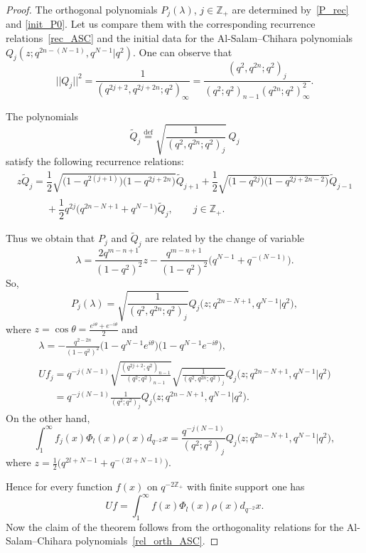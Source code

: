 \begin{proof}
The orthogonal polynomials $P_j(\lambda)$, $j\in\mathbb{Z}_+$ are determined by~\eqref{P_rec} and
\eqref{init_P0}. Let us compare them with the corresponding recurrence relations~\eqref{rec_ASC} and the
initial data for the Al-Salam--Chihara polynomials $Q_j(z;q^{2n-(N-1)},q^{N-1}|q^2)$. One can observe that
\[
||Q_j||^2=\frac{1}{(q^{2j+2},q^{2j+2n};q^2)_\infty}=\frac{(q^2,q^{2n};q^2)_j}{(q^2;q^2)_{n-1}(q^{2n};q^2)^2_\infty}.
\]

The polynomials
\[
\widetilde{Q}_j\overset{\mathrm{def}}{=}\sqrt{\frac{1}{(q^2,q^{2n};q^2)_j}} \,Q_j
\]
satisfy the following recurrence relations:
\begin{gather*}
z\widetilde{Q}_j=\dfrac12\sqrt{\big(1-q^{2(j+1)}\big)\big(1-q^{2j+2n}\big)}\widetilde{Q}_{j+1}+
\dfrac12\sqrt{\big(1-q^{2j}\big)\big(1-q^{2j+2n-2}\big)}\widetilde{Q}_{j-1}\\
\phantom{z\widetilde{Q}_j=}{} +\dfrac12q^{2j}\big(q^{2n-N+1}+q^{N-1}\big)\widetilde{Q}_j, \qquad j \in \mathbb Z_+.
\end{gather*}

Thus we obtain that $P_j$ and $\widetilde{Q}_j$ are related by the change of variable
\[
\lambda=\frac{2q^{m-n+1}}{(1-q^2)^2}z-\frac{q^{m-n+1}}{(1-q^2)^2}\big(q^{N-1}+q^{-(N-1)}\big).
\]
So,
\[
P_j(\lambda)=\sqrt{\frac{1}{(q^2,q^{2n};q^2)_j}}  Q_j\big(z;q^{2n-N+1},q^{N-1}|q^2\big),
\]
where $z=\cos \theta=\frac{e^{i\theta}+e^{-i\theta}}{2}$ and
\begin{gather*}
\lambda=-\frac{q^{2-2n}}{(1-q^2)^2}\big(1-q^{N-1}e^{i\theta}\big)\big(1-q^{N-1}e^{-i\theta}\big),\\
Uf_j=q^{-j(N-1)}\sqrt{\frac{(q^{2j+2};q^2)_{n-1}}{(q^{2};q^2)_{n-1}}}\sqrt{\frac{1}{(q^2,q^{2n};q^2)_j}}
Q_j\big(z;q^{2n-N+1},q^{N-1}|q^2\big) \\
\phantom{Uf_j}{} =q^{-j(N-1)}\frac{1}{(q^2;q^2)_j} Q_j\big(z;q^{2n-N+1},q^{N-1}|q^2\big).
\end{gather*}
On the other hand,
\[
\int_1^\infty
f_j(x)\Phi_{l}(x)\rho(x)d_{q^{-2}}x=\frac{q^{-j(N-1)}}{(q^2;q^2)_j} Q_j\big(z;q^{2n-N+1},q^{N-1}|q^2\big),
\]
where $z=\frac12\big(q^{2l+N-1}+q^{-(2l+N-1)}\big)$.

Hence for every function $f(x)$ on $q^{-2\mathbb{Z}_+}$ with f\/inite support one has
\[
Uf=\int_1^\infty f(x)\Phi_{l}(x)\rho(x)d_{q^{-2}}x.
\]
Now the claim of the theorem follows from the orthogonality relations for the Al-Salam--Chihara polynomials~\eqref{rel_orth_ASC}. \end{proof}
